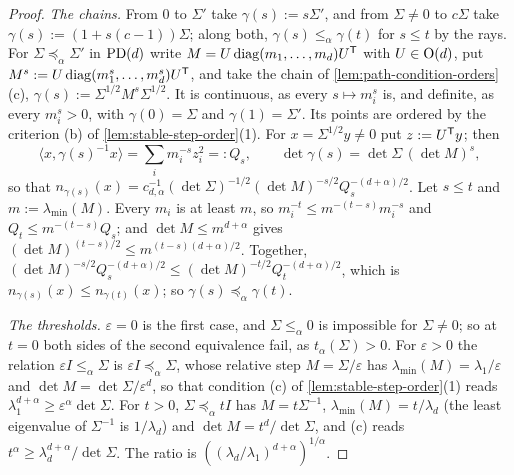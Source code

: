 \begin{proof}
\emph{The chains.} From $0$ to $\Sigma'$ take $\gamma(s) := s\Sigma'$, and from $\Sigma \ne 0$ to $c\Sigma$
take $\gamma(s) := (1 + s(c-1))\Sigma$; along both, $\gamma(s) \le_\alpha \gamma(t)$ for $s \le t$ by the
rays. For $\Sigma \preceq_\alpha \Sigma'$ in $\mathrm{PD}(d)$ write $M = U\operatorname{diag}(m_1, \dots, m_d)U^{\mathsf{T}}$ with
$U \in \mathrm{O}(d)$, put $M^s := U\operatorname{diag}(m_1^s, \dots, m_d^s)U^{\mathsf{T}}$, and take the chain of
\ref{lem:path-condition-orders}(c), $\gamma(s) := \Sigma^{1/2}M^s\Sigma^{1/2}$. It is continuous, as every
$s \mapsto m_i^s$ is, and definite, as every $m_i^s > 0$, with $\gamma(0) = \Sigma$ and $\gamma(1) = \Sigma'$. Its points are ordered by the criterion (b) of
\ref{lem:stable-step-order}(1). For $x = \Sigma^{1/2}y \ne 0$ put $z := U^{\mathsf{T}}y$; then
\[
  \langle x, \gamma(s)^{-1}x\rangle = \sum_{i} m_i^{-s}z_i^2 =: Q_s , \qquad
  \det\gamma(s) = \det\Sigma\,(\det M)^s ,
\]
so that $n_{\gamma(s)}(x) = c_{d,\alpha}^{-1}(\det\Sigma)^{-1/2}(\det M)^{-s/2}Q_s^{-(d+\alpha)/2}$. Let
$s \le t$ and $m := \lambda_{\min}(M)$. Every $m_i$ is at least $m$, so $m_i^{-t} \le m^{-(t-s)}m_i^{-s}$ and
$Q_t \le m^{-(t-s)}Q_s$; and $\det M \le m^{d+\alpha}$ gives $(\det M)^{(t-s)/2} \le
m^{(t-s)(d+\alpha)/2}$. Together,
$(\det M)^{-s/2}Q_s^{-(d+\alpha)/2} \le (\det M)^{-t/2}Q_t^{-(d+\alpha)/2}$, which is
$n_{\gamma(s)}(x) \le n_{\gamma(t)}(x)$; so $\gamma(s) \preceq_\alpha \gamma(t)$.

\emph{The thresholds.} $\varepsilon = 0$ is the first case, and $\Sigma \le_\alpha 0$ is impossible for
$\Sigma \ne 0$; so at $t = 0$ both sides of the second equivalence fail, as $t_\alpha(\Sigma) > 0$.
For $\varepsilon > 0$ the relation $\varepsilon I \le_\alpha \Sigma$ is
$\varepsilon I \preceq_\alpha \Sigma$, whose relative step $M = \Sigma/\varepsilon$ has
$\lambda_{\min}(M) = \lambda_1/\varepsilon$ and $\det M = \det\Sigma/\varepsilon^d$, so that condition (c) of
\ref{lem:stable-step-order}(1) reads $\lambda_1^{d+\alpha} \ge \varepsilon^\alpha\det\Sigma$. For $t > 0$,
$\Sigma \preceq_\alpha tI$ has $M = t\Sigma^{-1}$, $\lambda_{\min}(M) = t/\lambda_d$ (the least eigenvalue of
$\Sigma^{-1}$ is $1/\lambda_d$) and $\det M = t^d/\det\Sigma$, and (c) reads
$t^\alpha \ge \lambda_d^{d+\alpha}/\det\Sigma$. The ratio is $((\lambda_d/\lambda_1)^{d+\alpha})^{1/\alpha}$.
\end{proof}

